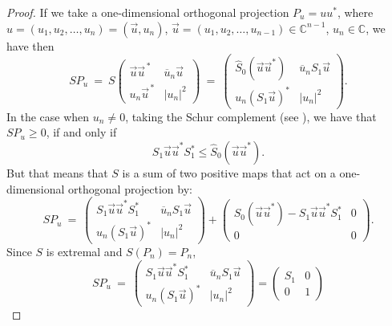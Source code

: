 \documentclass[12pt]{article}
\theoremstyle{plain}
\theoremstyle{definition}
\theoremstyle{remark}
\numberwithin{equation}{section}
\begin{document}
\begin{proof}
If we take a one-dimensional orthogonal projection 
$P_{u} = u u^{*}$, where
$u = (u_{1}, u_{2}, \ldots, u_{n}) = (\vec{u}, u_{n})$,
$\vec{u} = (u_{1}, u_{2}, \ldots, u_{n-1}) \in \mathbb{C}^{n-1}$,
$u_{n} \in \mathbb{C}$,
we have then
\begin{equation}
 SP_{u} \:=\:  S \begin{pmatrix}
    \vec{u} \vec{u}^{\,*} & \overline{u}_{n} \vec{u} \\
    u_{n} \vec{u}^{\,*}   & |u_{n}|^{2}
 \end{pmatrix} \: = \: 
 \begin{pmatrix}
    \hat{S}_{0}(\vec{u} \vec{u}^{*}) &
         \overline{u}_{n} S_{1} \vec{u} \\
    u_{n} ( S_{1} \vec{u} )^{*} &
        |u_{n}|^{2}
 \end{pmatrix}.
\end{equation}
In the case when $u_{n} \neq 0$,
taking the Schur complement
(see \cite[Theorem 1.12, p.34]{zhang2006schur}),
we have that $SP_{u} \geq 0$, if and only if
\begin{equation}
\label{ieq:SchurForS}
  S_{1} \vec{u} \vec{u}^{*} S_{1}^{*} \leq \hat{S}_{0}(\vec{u}\vec{u}^{*}).
\end{equation}
But that means that $S$ is a sum of two positive maps that act on a one-dimensional
orthogonal projection by:
\begin{equation}
 SP_{u} \:=\:  
 \begin{pmatrix}
      S_{1} \vec{u} \vec{u}^{*} S_{1}^{*}  &
         \overline{u}_{n} S_{1} \vec{u} \\
    u_{n} ( S_{1} \vec{u} )^{*} &
        |u_{n}|^{2}
 \end{pmatrix} +   
 \begin{pmatrix}
    \hat{S}_{0}(\vec{u} \vec{u}^{*})  -  S_{1} \vec{u} \vec{u}^{*} S_{1}^{*} & 0 \\
    0 & 0
 \end{pmatrix}.
\end{equation}
Since $S$ is extremal and $S(P_{n}) = P_{n}$,
\begin{equation}
 SP_{u} \:=\:  
 \begin{pmatrix}
      S_{1} \vec{u} \vec{u}^{*} S_{1}^{*}  &
         \overline{u}_{n} S_{1} \vec{u} \\
    u_{n} ( S_{1} \vec{u} )^{*} &
        |u_{n}|^{2}
 \end{pmatrix} = 
    \begin{pmatrix}
    S_{1} & 0 \\ 0 & 1
    \end{pmatrix}

\end{equation}
\end{proof}
\end{document}
